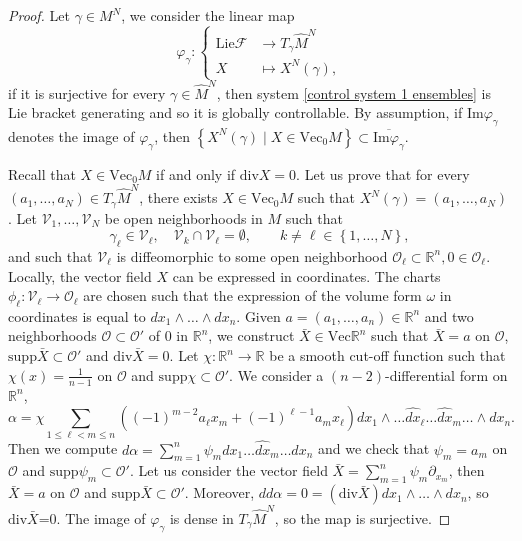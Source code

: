 \documentclass[10pt]{article}
\newcommand{\p}{\partial}
\newcommand{\R}{{\mathbb R}}
\newcommand{\F}{\mathcal F}
\newcommand{\ov}{\overline}
\newcommand{\we}{\wedge}
\begin{document}
\begin{proof}
    Let $\gamma\in M^N$, we consider the linear map
    \begin{equation*}
        \varphi_{\gamma} : \left\{\begin{array}{ll}
               \mathrm{Lie}\F
               &\rightarrow T_{\gamma} \hat{M}^N \\
              X &\mapsto X^N(\gamma),
        \end{array}\right.
    \end{equation*}
    if it is surjective for every $\gamma \in \hat{M}^N$, then system \eqref{control system 1 ensembles} is Lie bracket generating and so it is globally controllable. By assumption, if $\mathrm{Im}\varphi_\gamma$ denotes the image of $\varphi_\gamma$, then $\left\{X^N(\gamma) \mid X \in  \mathrm{Vec}_0M\right\}\subset \ov{\mathrm{Im}\varphi_\gamma}$.
    
    Recall that $X \in \mathrm{Vec}_0M$ if and only if $\mathrm{div}X=0$. Let us prove that for every $(a_1,\dots,a_N)\in T_{\gamma}\hat{M}^N$, there exists $X\in \mathrm{Vec}_0M$ such that $X^N(\gamma)=(a_1,\dots,a_N)$. Let $\mathcal{V}_1,\dots,\mathcal{V}_N$ be open neighborhoods in $M$ such that
    \begin{equation*}
        \gamma_\ell\in \mathcal{V}_\ell, \quad \mathcal{V}_k \cap \mathcal{V}_\ell = \emptyset, \qquad k\neq\ell \in \left\{1,\dots,N\right\},
    \end{equation*}
    and such that $\mathcal{V}_\ell$ is diffeomorphic to some open neighborhood $\mathcal{O}_\ell \subset \R^n, 0\in \mathcal{O}_\ell$. Locally, the vector field $X$ can be expressed in coordinates. The charts $\phi_\ell : \mathcal{V}_\ell \rightarrow \mathcal{O}_\ell$ are chosen such that the expression of the volume form $\omega$ in coordinates is equal to $dx_1\we\dots \we dx_n$. Given $a=(a_1,\dots,a_n)\in \R^n$ and two neighborhoods $\mathcal{O} \subset \mathcal{O}'$ of $0$ in $\R^n$, we construct $\bar{X} \in \mathrm{Vec}\R^n$ such that $\bar{X}=a$ on $\mathcal{O}$, $\mathrm{supp}\bar{X}\subset \mathcal{O}'$ and $\mathrm{div}\bar{X}=0$. Let $\chi : \R^n \rightarrow \R$ be a smooth cut-off function such that $\chi(x)=\frac{1}{n-1}$ on $\mathcal{O}$ and $\mathrm{supp}\chi\subset \mathcal{O}'$. We consider a $(n-2)$-differential form on $\R^n$,
    \begin{equation*}
        \alpha = \chi \sum_{1\leq \ell < m \leq n}((-1)^{m-2}a_\ell x_m + (-1)^{\ell-1}a_m x_\ell)dx_1 \we \dots \widehat{dx}_\ell \dots \widehat{dx}_m \dots \we dx_n.
    \end{equation*}
    Then we compute $d\alpha =\sum_{m=1}^n \psi_m dx_1\dots\widehat{dx}_m\dots dx_n$ and we check that $\psi_m=a_m$ on $\mathcal{O}$ and $\mathrm{supp} \psi_m\subset \mathcal{O}'$. Let us consider the vector field $\bar{X}=\sum_{m=1}^n\psi_m \p_{x_m}$, then $\bar{X}=a$ on $\mathcal{O}$ and $\mathrm{supp}\bar{X}\subset \mathcal{O}'$. Moreover, $dd\alpha=0=(\mathrm{div}\bar{X})dx_1 \we \dots \we dx_n$, so $\mathrm{div}\bar{X}$=0. The image of $\varphi_{\gamma}$ is dense in $T_{\gamma}\hat{M}^N$, so the map is surjective.
\end{proof}
\end{document}

